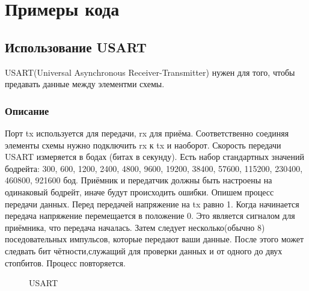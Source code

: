 \documentclass[12pt]{article}
\begin{document}
\section{Примеры кода}

\subsection{Использование USART}
USART(Universal Asynchronous Receiver-Transmitter) нужен для того, чтобы предавать данные между элементми схемы.
\subsubsection{Описание}
Порт tx используется для передачи, rx для приёма. Соответственно соединяя элементы схемы нужно подключить rx к tx и наоборот.
\newline Скорость передачи USART измеряется в бодах (битах в секунду). Есть набор стандартных значений бодрейта: 300, 600, 1200, 2400, 4800, 9600, 19200, 38400, 57600, 115200, 230400, 460800, 921600 бод. Приёмник и передатчик должны быть настроены на одинаковый бодрейт, иначе будут происходить ошибки. 
\newline Опишем процесс передачи данных. Перед передачей напряжение на tx равно 1. Когда начинается передача напряжение перемещается в положение 0. Это является сигналом для приёмника, что передача началась. Затем следует несколько(обычно 8) поседовательных импульсов, которые передают ваши данные. После этого может следвать бит чётности,служащий для проверки данных и от одного до двух стопбитов. Процесс повторяется.
\begin{figure}[h!] 
\caption{USART}
\label{u1}
\end{figure}
\end{document}
